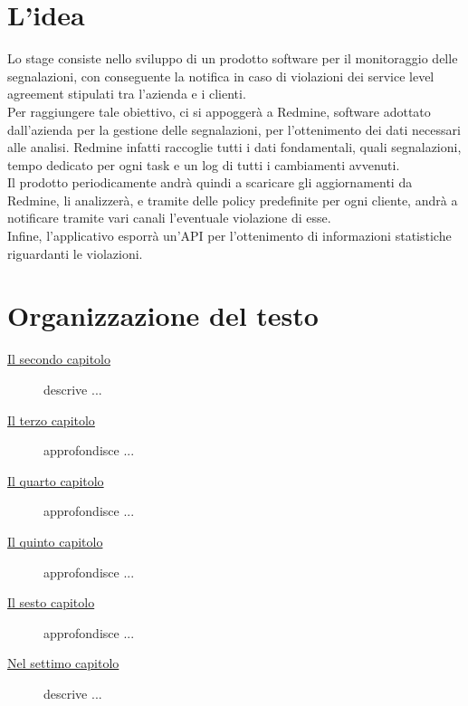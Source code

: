 \section{L'idea}

Lo stage consiste nello sviluppo di un prodotto software per il monitoraggio delle segnalazioni, con conseguente la notifica in caso di violazioni dei service level agreement stipulati tra l'azienda e i clienti.\\
Per raggiungere tale obiettivo, ci si appoggerà a Redmine, software adottato dall'azienda per la gestione delle segnalazioni, per l'ottenimento dei dati necessari alle analisi. Redmine infatti raccoglie tutti i dati fondamentali, quali segnalazioni, tempo dedicato per ogni task e un log di tutti i cambiamenti avvenuti. \\
Il prodotto periodicamente andrà quindi a scaricare gli aggiornamenti da Redmine, li analizzerà, e tramite delle policy predefinite per ogni cliente, andrà a notificare tramite vari canali l'eventuale violazione di esse. \\
Infine, l'applicativo esporrà un'API per l'ottenimento di informazioni statistiche riguardanti le violazioni. 

\section{Organizzazione del testo}

\begin{description}
    \item[{\hyperref[cap:processi-metodologie]{Il secondo capitolo}}] descrive ...
    
    \item[{\hyperref[cap:descrizione-stage]{Il terzo capitolo}}] approfondisce ...
    
    \item[{\hyperref[cap:analisi-requisiti]{Il quarto capitolo}}] approfondisce ...
    
    \item[{\hyperref[cap:progettazione-codifica]{Il quinto capitolo}}] approfondisce ...
    
    \item[{\hyperref[cap:verifica-validazione]{Il sesto capitolo}}] approfondisce ...
    
    \item[{\hyperref[cap:conclusioni]{Nel settimo capitolo}}] descrive ...
\end{description}

